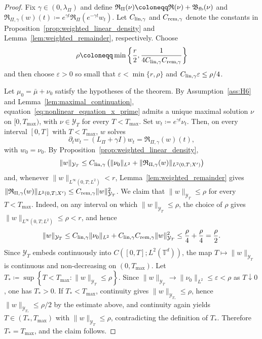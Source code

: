 \documentclass[11pt]{article}
\numberwithin{equation}{section}
\theoremstyle{definition}
\newcommand{\T}{\mathbb{T}}
\begin{document}
\begin{proof}
    Fix $\gamma \in (0,\lambda_\Pi)$ and define $\mathfrak{R}_\Pi(\nu) \coloneqq \mathfrak{R}(\nu) + \mathfrak{B}_{\rm fb}(\nu)$ and $\mathfrak{R}_{\Pi,\gamma}(w)(t) \coloneqq e^{\gamma t}\mathfrak{R}_\Pi(e^{-\gamma t}w_t)$.
    Let $C_{\rm lin,\gamma}$ and $C_{\rm rem,\gamma}$ denote the constants in Proposition~\ref{prop:weighted_linear_density} and Lemma~\ref{lem:weighted_remainder}, respectively.
    Choose
    \[
    \rho \coloneqq \min\left\{\frac{r}{2},\frac{1}{4C_{\rm lin,\gamma}C_{\rm rem,\gamma}}\right\}
    \]
    and then choose $\varepsilon > 0$ so small that $\varepsilon < \min\{r,\rho\}$ and $C_{\rm lin,\gamma} \varepsilon \le \rho / 4$.

    Let $\mu_0 = \bar\mu + \nu_0$ satisfy the hypotheses of the theorem.
    By Assumption~\ref{ass:H6} and Lemma~\ref{lem:maximal_continuation}, equation~\eqref{eq:nonlinear_equation_x_prime} admits a unique maximal solution $\nu$ on $[0,T_{\max})$, with $\nu \in \mathcal{Y}_T$ for every $T < T_{\max}$.
    Set $w_t\coloneqq e^{\gamma t}\nu_t$.
    Then, on every interval $[0,T]$ with $T < T_{\max}$, $w$ solves
    \[
    \partial_t w_t - (L_\Pi + \gamma I)w_t = \mathfrak{R}_{\Pi,\gamma}(w)(t),
    \]
    with $w_0 = \nu_0$.
    By Proposition~\ref{prop:weighted_linear_density},
    \[
    \|w\|_{\mathcal{Y}_T} \le C_{\rm lin,\gamma}\left(\|\nu_0\|_{L^2} + \|\mathfrak{R}_{\Pi,\gamma}(w)\|_{L^2(0,T;X')}\right)
    \]
    and, whenever $\|w\|_{L^\infty(0,T;L^2)} < r$, Lemma~\ref{lem:weighted_remainder} gives $\|\mathfrak{R}_{\Pi,\gamma}(w)\|_{L^2(0,T;X')} \le C_{\rm rem,\gamma}\|w\|_{\mathcal{Y}_T}^2$.
    We claim that $\|w\|_{\mathcal{Y}_T} \le \rho$ for every $T < T_{\max}$.
    Indeed, on any interval on which $\|w\|_{\mathcal{Y}_T} \le \rho$, the choice of $\rho$ gives $\|w\|_{L^\infty(0,T;L^2)} \le \rho < r$, and hence
    \[
    \|w\|_{\mathcal{Y}_T} \le C_{\rm lin,\gamma}\|\nu_0\|_{L^2} + C_{\rm lin,\gamma}C_{\rm rem,\gamma}\|w\|_{\mathcal{Y}_T}^2 \le \frac{\rho}{4} + \frac{\rho}{4} = \frac{\rho}{2}.
    \]
    Since $\mathcal{Y}_T$ embeds continuously into $C([0,T]; L^2(\T^d))$, the map $T \mapsto \|w\|_{\mathcal{Y}_T}$ is continuous and non-decreasing on $(0, T_{\max})$.
    Let $T_* \coloneqq \sup \left\{T < T_{\max} : \|w\|_{\mathcal{Y}_T} \le \rho \right\}$.
    Since $\|w\|_{\mathcal{Y}_T} \to \|\nu_0\|_{L^2} \le \varepsilon < \rho$ as $T \downarrow 0$, one has $T_* > 0$.
    If $T_* < T_{\max}$, continuity gives $\|w\|_{\mathcal{Y}_{T_*}} \le \rho$, hence $\|w\|_{\mathcal{Y}_{T_*}} \le \rho/2$ by the estimate above, and continuity again yields $T \in (T_*, T_{\max})$ with $\|w\|_{\mathcal{Y}_T} \le \rho$, contradicting the definition of $T_*$.
    Therefore $T_* = T_{\max}$, and the claim follows.


\end{proof}
\end{document}
